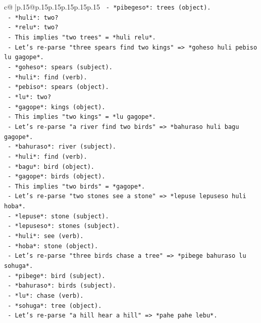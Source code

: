 \documentclass{article}
\begin{document}
{\begin{supertabular}{c@{$\;$}|p{.15\linewidth}@{}p{.15\linewidth}p{.15\linewidth}p{.15\linewidth}p{.15\linewidth}p{.15\linewidth}}
{{{\texttt{      {-} *pibegeso*: trees (object).} \\
\texttt{      {-} *huli*: two?} \\
\texttt{      {-} *relu*: two?} \\
\texttt{      {-} This implies "two trees" = *huli relu*.} \\
\texttt{    {-} Let's re{-}parse "three spears find two kings" => *goheso huli pebiso lu gagope*.} \\
\texttt{      {-} *goheso*: spears (subject).} \\
\texttt{      {-} *huli*: find (verb).} \\
\texttt{      {-} *pebiso*: spears (object).} \\
\texttt{      {-} *lu*: two?} \\
\texttt{      {-} *gagope*: kings (object).} \\
\texttt{      {-} This implies "two kings" = *lu gagope*.} \\
\texttt{    {-} Let's re{-}parse "a river find two birds" => *bahuraso huli bagu gagope*.} \\
\texttt{      {-} *bahuraso*: river (subject).} \\
\texttt{      {-} *huli*: find (verb).} \\
\texttt{      {-} *bagu*: bird (object).} \\
\texttt{      {-} *gagope*: birds (object).} \\
\texttt{      {-} This implies "two birds" = *gagope*.} \\
\texttt{    {-} Let's re{-}parse "two stones see a stone" => *lepuse lepuseso huli hoba*.} \\
\texttt{      {-} *lepuse*: stone (subject).} \\
\texttt{      {-} *lepuseso*: stones (subject).} \\
\texttt{      {-} *huli*: see (verb).} \\
\texttt{      {-} *hoba*: stone (object).} \\
\texttt{    {-} Let's re{-}parse "three birds chase a tree" => *pibege bahuraso lu sohuga*.} \\
\texttt{      {-} *pibege*: bird (subject).} \\
\texttt{      {-} *bahuraso*: birds (subject).} \\
\texttt{      {-} *lu*: chase (verb).} \\
\texttt{      {-} *sohuga*: tree (object).} \\
\texttt{    {-} Let's re{-}parse "a hill hear a hill" => *pahe pahe lebu*.} \\
}}}
\end{supertabular}}
\end{document}
